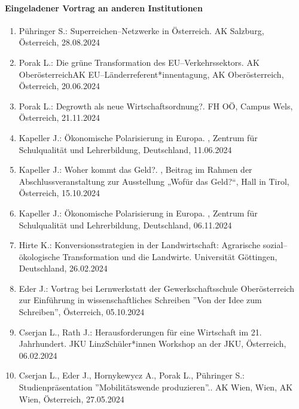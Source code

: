 \paragraph{Eingeladener Vortrag an anderen Institutionen}
\begin{enumerate}
	\item Pühringer S.: Superreichen--Netzwerke in Österreich. AK Salzburg, Österreich, 28.08.2024
	\item Porak L.: Die grüne Transformation des EU--Verkehrssektors. AK OberösterreichAK EU--Länderreferent*innentagung, AK Oberösterreich, Österreich, 20.06.2024
	\item Porak L.: Degrowth als neue Wirtschaftsordnung?. FH OÖ, Campus Wels, Österreich, 21.11.2024
	\item Kapeller J.: Ökonomische Polarisierung in Europa. , Zentrum für Schulqualität und Lehrerbildung, Deutschland, 11.06.2024
	\item Kapeller J.: Woher kommt das Geld?. , Beitrag im Rahmen der Abschlussveranstaltung zur Ausstellung „Wofür das Geld?“, Hall in Tirol, Österreich, 15.10.2024
	\item Kapeller J.: Ökonomische Polarisierung in Europa. , Zentrum für Schulqualität und Lehrerbildung, Deutschland, 06.11.2024
	\item Hirte K.: Konversionsstrategien in der Landwirtschaft: Agrarische sozial--ökologische Transformation und die Landwirte. Universität Göttingen, Deutschland, 26.02.2024
	\item Eder J.: Vortrag bei Lernwerkstatt der Gewerkschaftsschule Oberösterreich zur Einführung in wissenschaftliches Schreiben ''Von der Idee zum Schreiben'', Österreich, 05.10.2024
	\item Cserjan L., Rath J.: Herausforderungen für eine Wirtschaft im 21. Jahrhundert. JKU LinzSchüler*innen Workshop an der JKU, Österreich, 06.02.2024
	\item Cserjan L., Eder J., Hornykewycz A., Porak L., Pühringer S.: Studienpräsentation ''Mobilitätswende produzieren''.. AK Wien, Wien, AK Wien, Österreich, 27.05.2024
\end{enumerate}
